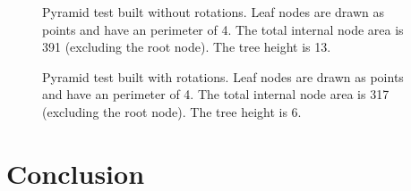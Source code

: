 \documentclass{article}
\begin{document}
\begin{figure}
	\begin{center}
		
	\end{center}
	\caption{ Pyramid test built without rotations. Leaf nodes are drawn as points and have an perimeter of 4. The total internal node area is 391 (excluding the root node). The tree height is 13. }
	\label{fig:pyramid_base}
\end{figure}

\begin{figure}
	\begin{center}
		
	\end{center}
	\caption{ Pyramid test built with rotations. Leaf nodes are drawn as points and have an perimeter of 4. The total internal node area is 317 (excluding the root node). The tree height is 6. }
	\label{fig:pyramid_rotate}
\end{figure}

\section{Conclusion}



\end{document}
